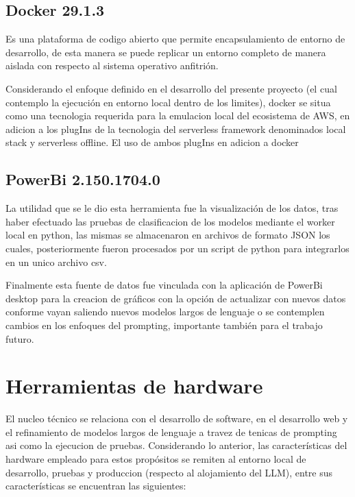 \subsection{Docker 29.1.3}

Es una plataforma de codigo abierto que permite encapsulamiento de entorno de desarrollo, de esta manera se puede replicar un entorno completo de manera aislada con respecto al sistema operativo anfitrión.

Considerando el enfoque definido en el desarrollo del presente proyecto (el cual contemplo la ejecución en entorno local dentro de los limites), docker se situa como una tecnologia requerida para la emulacion local del ecosistema de AWS, en adicion a los plugIns de la tecnologia del serverless framework denominados local stack y serverless offline. El uso de ambos plugIns en adicion a docker 

\cite{serverless_offline_plugin}
\cite{localstack_github}
\cite{docker_docs_overview}

\subsection{PowerBi 2.150.1704.0}

La utilidad que se le dio esta herramienta fue la visualización de los datos, tras haber efectuado las pruebas de clasificacion de los modelos mediante el worker local en python, las mismas se almacenaron en archivos de formato JSON los cuales, posteriormente fueron procesados por un script de python para integrarlos en un unico archivo csv.
 
Finalmente esta fuente de datos fue vinculada con la aplicación de PowerBi desktop para la creacion de gráficos con la opción de actualizar con nuevos datos conforme vayan saliendo nuevos modelos largos de lenguaje o se contemplen cambios en los enfoques del prompting, importante también para el trabajo futuro. \cite{WhatIsPB}

\section{Herramientas de hardware}

El nucleo técnico se relaciona con el desarrollo de software, en el desarrollo web y el refinamiento de modelos largos de lenguaje a travez de tenicas de prompting asi como la ejecucion de pruebas. Considerando lo anterior, las características del hardware empleado para estos propósitos se remiten al entorno local de desarrollo, pruebas y produccion (respecto al alojamiento del LLM), entre sus características se encuentran las siguientes:

